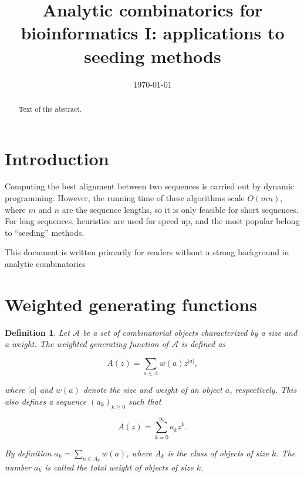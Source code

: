 \documentclass{article}
\title{Analytic combinatorics for bioinformatics I: applications to
seeding methods}
\date{\today}
\newtheorem{definition}{Definition}
\begin{document}
\maketitle

\begin{abstract}
Text of the abstract.
\end{abstract}



\section{Introduction}

Computing the best alignment between two sequences is carried out by
dynamic programming. However, the running time of these algorithms scale
$O(mn)$, where $m$ and $n$ are the sequence lengths, so it is only
feasible for short sequences. For long sequences, heuristics are used for
speed up, and the most popular belong to ``seeding'' methods.

This document is written primarily for readers without a strong background
in analytic combinatorics

\section{Weighted generating functions}
\label{sec:WGF}

\begin{definition}
\label{def:GF}
Let $\mathcal{A}$ be a set of combinatorial objects characterized by a
size and a weight. The weighted generating function of $\mathcal{A}$ is
defined as

\begin{equation}
\label{eq:GF1}
A(z) = \sum_{a \in A} w(a) z^{|a|},
\end{equation}

\noindent
where $|a|$ and $w(a)$ denote the size and weight of an object $a$,
respectively. This also defines a sequence $(a_k)_{k \geq 0}$ such that 

\begin{equation}
\label{eq:GF2}
A(z) = \sum_{k=0}^\infty a_k z^k.
\end{equation}

By definition $a_k = \sum_{a \in A_k}w(a)$, where $A_k$ is the class of
objects of size $k$. The number $a_k$ is called the total weight of
objects of size $k$.
\end{definition}
\end{document}
